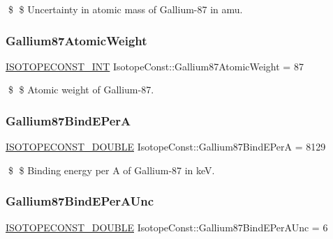 \$ \$ Uncertainty in atomic mass of Gallium-\/87 in amu. \mbox{\label{group___isotope_const-_gallium-_ga87_ga27f9b071cab3fd396da7503c27ed5ac6}} 
\subsubsection{\texorpdfstring{Gallium87\+Atomic\+Weight}{Gallium87AtomicWeight}}
{\footnotesize\ttfamily \mbox{\hyperlink{group___isotope_const-_macros_ga5f18360b3e99483a35c32d789e62621c}{I\+S\+O\+T\+O\+P\+E\+C\+O\+N\+S\+T\+\_\+\+I\+NT}} Isotope\+Const\+::\+Gallium87\+Atomic\+Weight = 87}

\$ \$ Atomic weight of Gallium-\/87. \mbox{\label{group___isotope_const-_gallium-_ga87_ga97e1442b23cd22e52e8faa905b24868b}} 
\subsubsection{\texorpdfstring{Gallium87\+Bind\+E\+PerA}{Gallium87BindEPerA}}
{\footnotesize\ttfamily \mbox{\hyperlink{group___isotope_const-_macros_ga8f45a7272ce02c0b4c65c44636ed719a}{I\+S\+O\+T\+O\+P\+E\+C\+O\+N\+S\+T\+\_\+\+D\+O\+U\+B\+LE}} Isotope\+Const\+::\+Gallium87\+Bind\+E\+PerA = 8129}

\$ \$ Binding energy per A of Gallium-\/87 in keV. \mbox{\label{group___isotope_const-_gallium-_ga87_gad68cd64a57efc08bd9429b8644ab90fb}} 
\subsubsection{\texorpdfstring{Gallium87\+Bind\+E\+Per\+A\+Unc}{Gallium87BindEPerAUnc}}
{\footnotesize\ttfamily \mbox{\hyperlink{group___isotope_const-_macros_ga8f45a7272ce02c0b4c65c44636ed719a}{I\+S\+O\+T\+O\+P\+E\+C\+O\+N\+S\+T\+\_\+\+D\+O\+U\+B\+LE}} Isotope\+Const\+::\+Gallium87\+Bind\+E\+Per\+A\+Unc = 6}

